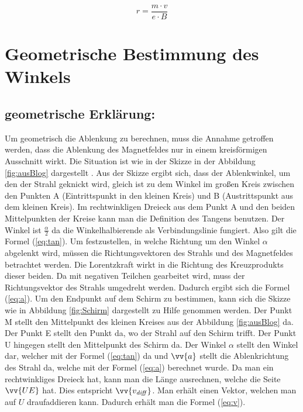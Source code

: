 \begin{equation}
     \label{eq:r}
     r = \frac{m \cdot v}{e \cdot B}
\end{equation}

\section{Geometrische Bestimmung des Winkels}

\subsection{geometrische Erklärung:}

Um geometrisch die Ablenkung zu berechnen, muss die Annahme getroffen werden, dass die Ablenkung des Magnetfeldes nur in einem kreisförmigen Ausschnitt wirkt.
Die Situation ist wie in der Skizze in der Abbildung \ref{fig:ausBlog} dargestellt \cite{Blog}.
Aus der Skizze ergibt sich, dass der Ablenkwinkel, um den der Strahl geknickt wird, gleich ist zu dem Winkel im großen Kreis zwischen den Punkten A (Eintrittspunkt in den kleinen Kreis) und B (Austrittspunkt aus dem kleinen Kreis).
Im rechtwinkligen Dreieck aus dem Punkt A und den beiden Mittelpunkten der Kreise kann man die Definition des Tangens benutzen.
Der Winkel ist $\frac{\alpha}{2}$ da die Winkelhalbierende als Verbindungslinie fungiert.
Also gilt die Formel (\ref{eq:tan}).
Um festzustellen, in welche Richtung um den Winkel $\alpha$ abgelenkt wird, müssen die Richtungsvektoren des Strahls und des Magnetfeldes betrachtet werden.
Die Lorentzkraft wirkt in die Richtung des Kreuzprodukts dieser beiden.
Da mit negativen Teilchen gearbeitet wird, muss der Richtungsvektor des Strahls umgedreht werden. Dadurch ergibt sich die Formel (\ref{eq:a}).
Um den Endpunkt auf dem Schirm zu bestimmen, kann sich die Skizze wie in Abbildung \ref{fig:Schirm} dargestellt zu Hilfe genommen werden.
Der Punkt M stellt den Mittelpunkt des kleinen Kreises aus der Abbildung \ref{fig:ausBlog} da.
Der Punkt E stellt den Punkt da, wo der Strahl auf den Schirm trifft.
Der Punkt U hingegen stellt den Mittelpunkt des Schirm da.
Der Winkel $\alpha$ stellt den Winkel dar, welcher mit der Formel (\ref{eq:tan}) da und $\vv{a}$ stellt die Ablenkrichtung des Strahl da, welche mit der Formel (\ref{eq:a}) berechnet wurde.
Da man ein rechtwinkliges Dreieck hat, kann man die Länge ausrechnen, welche die Seite $\vv{UE}$ hat.
Dies entspricht $\vv{v_\mathit{diff}}$.
Man erhält einen Vektor, welchen man auf $U$ draufaddieren kann.
Dadurch erhält man die Formel (\ref{eq:v}).
